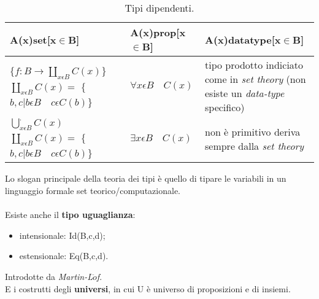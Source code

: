 \begin{table}[H]
\centering
\begin{tabularx}{\textwidth}{p{3.8cm}XX}
\hline 
\rowcolor{orange}
{\color[HTML]{FFFFFF}\textbf{A(x)set[x$\in$B]}} & {\color[HTML]{FFFFFF} \textbf{A(x)prop[x$\in$B]}} & {\color[HTML]{FFFFFF}\textbf{A(x)datatype[x$\in$B]}}\\
\hline\hline
\centering \scriptsize{\{$\displaystyle f: B \rightarrow \displaystyle\coprod\limits_{x \epsilon B} C(x)$\}} \scriptsize{$\displaystyle\coprod\limits_{x \epsilon B} C(x) =$ \{$b,c | b\epsilon B \quad c\epsilon C(b)$\}}& \centering \small{$\displaystyle \forall {x \epsilon B} \quad C(x)$} & tipo prodotto indiciato come in \textit{set theory} (non esiste un \textit{data-type} specifico)\\
\hline
\centering \scriptsize{$\displaystyle\bigcup\limits_{x \epsilon B}^. C(x)$} \qquad \qquad \qquad \scriptsize{$\displaystyle\coprod\limits_{x \epsilon B} C(x) =$ \{$b,c | b\epsilon B \quad c\epsilon C(b)$\}} & \centering \small{$\displaystyle \exists{x \epsilon B} \quad C(x)$} & non \`e primitivo deriva sempre dalla \textit{set theory}\\
\end{tabularx}
\caption{\label{tab:tipi-dipendenti}Tipi dipendenti.} 
\end{table}
\noindent
Lo slogan principale della teoria dei tipi \`e quello di tipare le variabili in un linguaggio formale set teorico/computazionale.\\\\
Esiste anche il \textbf{tipo uguaglianza}:
\begin{itemize}
\item intensionale: Id(B,c,d);
\item estensionale: Eq(B,c,d).
\end{itemize}
\noindent
Introdotte da \textit{Martin-L$\ddot{o}$f}.\\
E i costrutti degli \textbf{universi}, in cui U \`e universo di proposizioni e di insiemi.
